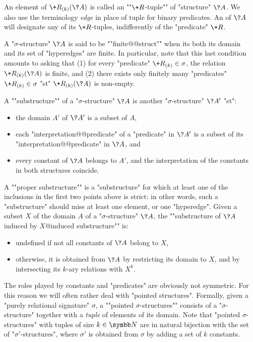 An element of $\+R_{(k)}(\?A)$ is called an \AP""$\+R$-tuple""
of "structure" $\?A$. We also use the terminology \emph{edge} in place
of tuple for binary predicates.
An  of $\?A$ will designate any of its $\+R$-tuples,
indifferently of the "predicate" $\+R$.

A "$\sigma$-structure" $\?A$ is said to be \AP""finite@@struct"" when its
both its domain and its set of "hyperedges" are finite.
In particular, note that this last condition amounts to asking
that (1) for every "predicate" $\+R_{(k)} \in \sigma$, the relation $\+R_{(k)}(\?A)$ is finite,
and (2) there exists only finitely many "predicates" $\+R_{(k)} \in \sigma$
"st" $\+R_{(k)}(\?A)$ is non-empty.

A \AP""substructure"" of a "$\sigma$-structure" $\?A$ is another
"$\sigma$-structure" $\?A'$ "st":
\begin{itemize}
	\item the domain $A'$ of $\?A'$ is a subset of $A$,
	\item each "interpretation@@predicate" of a "predicate" in $\?A'$ 
		is a subset of its "interpretation@@predicate" in $\?A$, and
	\item every constant of $\?A$ belongs to $A'$, and the interpretation
		of the constants in both structures coincide. 
\end{itemize}
A \AP""proper substructure"" is a "substructure" for which
at least one of the inclusions in the first two points above
is strict: in other words, such a "substructure" should
miss at least one element, or one "hyperedge".
Given a subset $X$ of the domain $A$ of a "$\sigma$-structure" $\?A$,
the \AP""substructure of $\?A$ induced by $X$@induced substructure"" is:
\begin{itemize}
	\item undefined if not all constants of $\?A$ belong to $X$,
	\item otherwise, it is obtained from $\?A$ by restricting
		its domain to $X$, and by intersecting its $k$-ary relations
		with $X^k$.
\end{itemize}

The roles played by constants and "predicates" are obviously not symmetric.
For this reason we will often rather deal with "pointed structures".
Formally, given a "purely relational signature" $\sigma$,
a \AP""pointed $\sigma$-structures"" consists of a "$\sigma$-structure"
together with a \emph{tuple} of elements of its domain.
Note that "pointed $\sigma$-structures" with tuples of size $k\in \N$ are in natural
bijection with the set of "$\sigma'$-structures", where $\sigma'$
is obtained from $\sigma$ by adding a set of $k$ constants.

